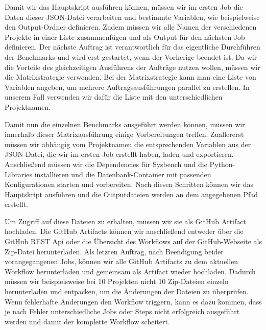 Damit wir das Hauptskript ausführen können, müssen wir im ersten Job die Daten dieser JSON-Datei verarbeiten und bestimmte Variablen, wie beispielweise den Output-Ordner definieren.
Zudem müssen wir alle Namen der verschiedenen Projekte in einer Liste zusammenfügen und als Output für den nächsten Job definieren.
Der nächste Auftrag ist verantwortlich für das eigentliche Durchführen der Benchmarks und wird erst gestartet, wenn der Vorherige beendet ist.
Da wir die Vorteile des gleichzeitigen Ausführens der Aufträge nutzen wollen, müssen wir die Matrixstrategie verwenden.
Bei der Matrixstrategie kann man eine Liste von Variablen angeben, um mehrere Auftragsausführungen parallel zu erstellen.
In unserem Fall verwenden wir dafür die Liste mit den unterschiedlichen Projektnamen.

Damit nun die einzelnen Benchmarks ausgeführt werden können, müssen wir innerhalb dieser Matrixausführung einige Vorbereitungen treffen.
Zuallererst müssen wir abhängig vom Projektnamen die entsprechenden Variablen aus der JSON-Datei, die wir im ersten Job erstellt haben, laden und exportieren.
Anschließend müssen wir die Dependencies für Sysbench und die Python-Libraries installieren und die Datenbank-Container mit passenden Konfigurationen starten und vorbereiten.
Nach diesen Schritten können wir das Hauptskript ausführen und die Outputdateien werden an dem angegebenen Pfad erstellt.

Um Zugriff auf diese Dateien zu erhalten, müssen wir sie als GitHub Artifact hochladen.
Die GitHub Artifacts können wir anschließend entweder über die GitHub REST Api oder die Übersicht des Workflows auf der GitHub-Webseite als Zip-Datei herunterladen.
Als letzten Auftrag, nach Beendigung beider vorangegangenen Jobs, können wir alle GitHub Artifacts zu dem aktuellen Workflow herunterladen und gemeinsam als Artifact wieder hochladen.
Dadurch müssen wir beispielsweise bei 10 Projekten nicht 10 Zip-Dateien einzeln herunterladen und entpacken, um die Änderungen der Dateien zu überprüfen.
Wenn fehlerhafte Änderungen den Workflow triggern, kann es dazu kommen, dass je nach Fehler unterschiedliche Jobs oder Steps nicht erfolgreich ausgeführt werden und damit der komplette Workflow scheitert.

